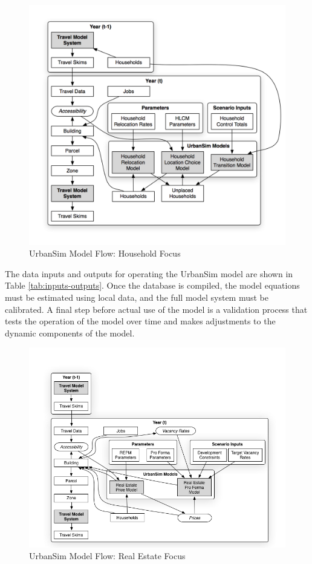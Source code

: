 \begin{figure}[h]
\center
 \includegraphics[width=5in]{graphics/ParcelHouseholdModel.png}
\caption{UrbanSim Model Flow: Household Focus}
\label{fig:household-models}
\end{figure}
\clearpage

The data inputs and outputs for operating the UrbanSim model are shown in Table \ref{tab:inputs-outputs}.  Once the database is compiled, the model equations must be estimated using local data, and the full model system must be calibrated.  A final step before actual use of the model is a validation process that tests the operation of the model over time and makes adjustments to the dynamic components of the model.  

\begin{figure}[h]
\center
 \includegraphics[width=6.0in]{graphics/ParcelRealEstateModel.png}
\caption{UrbanSim Model Flow: Real Estate Focus}
\label{fig:parcel-models}
\end{figure}




